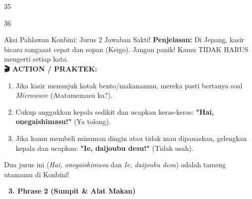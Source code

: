 \begin{convobox}{35}
    \noindent
      

    \vspace{1.5em}
\end{convobox}

\begin{convobox}{36}
    \noindent

    \vspace{1.5em}
\end{convobox}

\begin{lessonbox}{Aksi Pahlawan Konbini: Jurus 2 Jawaban Sakti!}
    \textbf{Penjelasan:} Di Jepang, kasir bicara sangaaat cepat dan sopan (Keigo). Jangan panik! Kamu TIDAK HARUS mengerti setiap kata.
    \\
    \textbf{🎬 ACTION / PRAKTEK:} 
    \begin{enumerate}
        \item Jika kasir menunjuk kotak bento/makananmu, mereka pasti bertanya soal \textit{Microwave} (Atatamemasu ka?).
        \item Cukup anggukkan kepala sedikit dan ucapkan keras-keras: \textbf{"Hai, onegaishimasu!"} (Ya tolong). 
        \item Jika kamu membeli minuman dingin atau tidak mau dipanaskan, gelengkan kepala dan ucapkan: \textbf{"Ie, daijoubu desu!"} (Tidak usah).
    \end{enumerate}
    Dua jurus ini (\textit{Hai, onegaishimasu} dan \textit{Ie, daijoubu desu}) adalah tameng utamamu di Konbini!
\end{lessonbox}

\vspace{2em}
\begin{tcolorbox}[colback=boxframe, colframe=boxframe, rounded corners, boxrule=0pt, arc=3mm, left=2mm, top=2mm, bottom=2mm]
    \Large \bfseries \color{white} 🥢 3. Phrase 2 (Sumpit \& Alat Makan)
\end{tcolorbox}
\vspace{1em}

